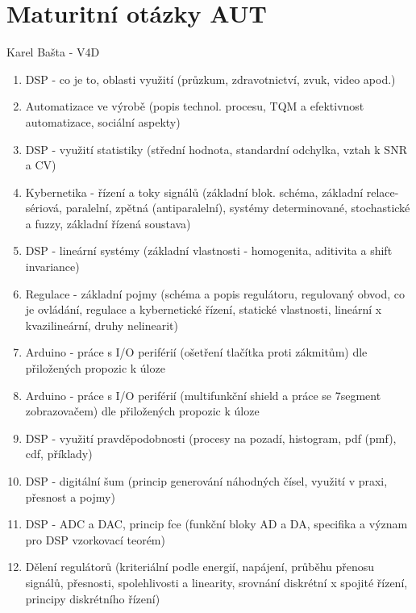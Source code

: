 \documentclass[11pt]{article}
\begin{document}

    \section*{Maturitní otázky AUT}
        \begin{center}
            \Large Karel Bašta - V4D
        \end{center}
        \begin{enumerate}
            \item DSP - co je to, oblasti využití (průzkum, zdravotnictví, zvuk, video apod.)
            \item Automatizace ve výrobě (popis technol. procesu, TQM a efektivnost automatizace, sociální aspekty)
            \item DSP - využití statistiky (střední hodnota, standardní odchylka, vztah k SNR a CV)
            \item Kybernetika - řízení a toky signálů (základní blok. schéma, základní relace- sériová, paralelní, zpětná (antiparalelní), systémy determinované, stochastické a fuzzy, základní řízená soustava)
            \item DSP - lineární systémy (základní vlastnosti - homogenita, aditivita a shift invariance)
            \item Regulace - základní pojmy (schéma a popis regulátoru, regulovaný obvod, co je ovládání, regulace a kybernetické řízení, statické vlastnosti, lineární x kvazilineární, druhy nelinearit)
            \item Arduino - práce s I/O periférií (ošetření tlačítka proti zákmitům) dle přiložených propozic k úloze
            \item Arduino - práce s I/O periférií (multifunkční shield a práce se 7segment zobrazovačem) dle přiložených propozic k úloze
            \item DSP - využití pravděpodobnosti (procesy na pozadí, histogram, pdf (pmf), cdf, příklady)
            \item DSP - digitální šum (princip generování náhodných čísel, využití v praxi, přesnost a pojmy)
            \item DSP - ADC a DAC, princip fce (funkční bloky AD a DA, specifika a význam pro DSP vzorkovací teorém)
            \item Dělení regulátorů (kriteriální podle energií, napájení, průběhu přenosu signálů, přesnosti, spolehlivosti a linearity, srovnání diskrétní x spojité řízení, principy diskrétního řízení)

\end{enumerate}
\end{document}
